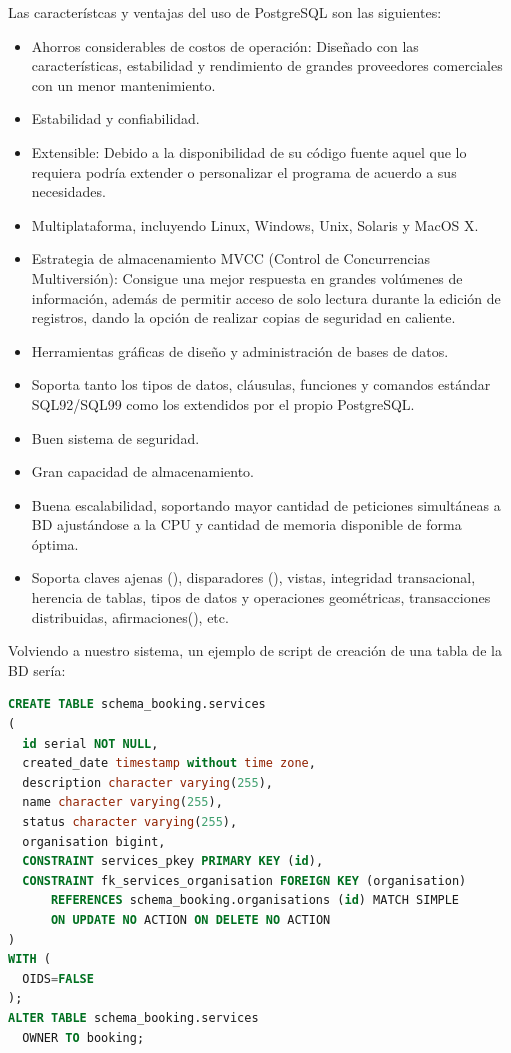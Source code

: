 Las característcas y ventajas del uso de PostgreSQL son las siguientes: 

\begin{itemize}
\item Ahorros considerables de costos de operación: Diseñado con las características, estabilidad y rendimiento de grandes proveedores comerciales con un menor mantenimiento.
\item Estabilidad y confiabilidad. 
\item Extensible: Debido a la disponibilidad de su código fuente aquel que lo requiera podría extender o personalizar el programa de acuerdo a sus necesidades.
\item Multiplataforma, incluyendo Linux, Windows, Unix, Solaris y MacOS X.
\item Estrategia de almacenamiento MVCC (Control de Concurrencias Multiversión): Consigue una mejor respuesta en grandes volúmenes de información, además de permitir acceso de solo lectura durante la edición de registros, dando la opción de realizar copias de seguridad en caliente.
\item Herramientas gráficas de diseño y administración de bases de datos.
\item Soporta tanto los tipos de datos, cláusulas, funciones y comandos estándar SQL92/SQL99 como los extendidos por el propio PostgreSQL.
\item Buen sistema de seguridad.
\item Gran capacidad de almacenamiento.
\item Buena escalabilidad, soportando mayor cantidad de peticiones simultáneas a BD ajustándose a la CPU y cantidad de memoria disponible de forma óptima.
\item Soporta claves ajenas (), disparadores (), vistas, integridad transacional, herencia de tablas, tipos de datos y operaciones geométricas, transacciones distribuidas, afirmaciones(), etc.
\end{itemize}

Volviendo a nuestro sistema, un ejemplo de script de creación de una tabla de la BD sería: 

\begin{lstlisting}[language=SQL, showspaces=false]
CREATE TABLE schema_booking.services
(
  id serial NOT NULL,
  created_date timestamp without time zone,
  description character varying(255),
  name character varying(255),
  status character varying(255),
  organisation bigint,
  CONSTRAINT services_pkey PRIMARY KEY (id),
  CONSTRAINT fk_services_organisation FOREIGN KEY (organisation)
      REFERENCES schema_booking.organisations (id) MATCH SIMPLE
      ON UPDATE NO ACTION ON DELETE NO ACTION
)
WITH (
  OIDS=FALSE
);
ALTER TABLE schema_booking.services
  OWNER TO booking;
\end{lstlisting}

